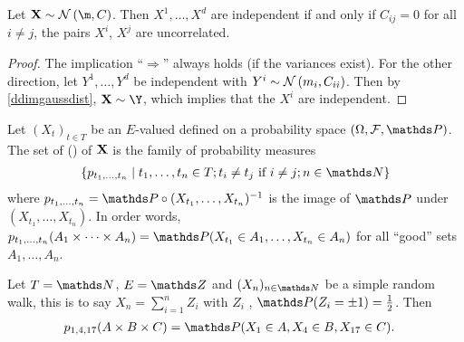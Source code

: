 \begin{prop}
	Let $\X \sim \Ndist{\m}{C}$.
	Then $X^1, \dots, X^d$ are independent \RVs
	if and only if
	$C_{ij}=0$ for all $i\not = j$,
	\ie the pairs $X^i$, $X^j$ are uncorrelated.
\end{prop}
\begin{proof}
	The implication “$\Rightarrow$”
	always holds (if the variances exist).
	For the other direction,
	let $Y^1, \dots, Y^d$ be independent
	with $Y^i \sim \mathcal{N}\left(m_i,C_{ii}\right)$.
	Then by \ref{ddimgaussdist}, $\X \sim \Y$,
	which implies that the $X^i$ are independent.
\end{proof}

\begin{defi}\label{fdd}
	Let $(X_t)_{t \in T}$ be an $E$-valued \SP
	defined on a probability space $(\Omega,\mathcal{F},\Prob)$.
	The set of  ()
	of $\mathbf{X}$ is the family of probability measures
	\begin{align*}
		\{p_{t_1,\dots,t_n} \mid
			t_1,\dots,t_n \in T;
			\text{\(t_i \neq t_j\) if \(i \neq  j\)};
			n\in \N
		\}
	\end{align*}
	where $p_{t_1,\dots,t_n} = \Prob \circ (X_{t_1},\dots,X_{t_n})^{-1}$
	is the image of $\Prob$ under $(X_{t_1},\dots,X_{t_n})$.
	In order words,
	$p_{t_1,\dots,t_n}(A_1\times \dots \times A_n)
	= \Prob(X_{t_1}\in A_1,\dots,X_{t_n}\in A_n)$
	for all “good” sets $A_1,\dots,A_n$.
\end{defi}

\begin{bsp}
	Let $T=\N$, $E=\Z$ and $(X_n)_{n\in \N}$ be a simple random walk,
	this is to say $X_n=\sum_{i=1}^n Z_i$
	with $Z_i$ \iid, $\Prob(Z_i=\pm 1)=\frac{1}{2}$.
	Then
	\begin{align*}
		p_{1,4,17}(A\times B\times C)
		&= \Prob(X_1\in A, X_4\in B, X_{17}\in C).
	\qedhere
	\end{align*}
\end{bsp}

